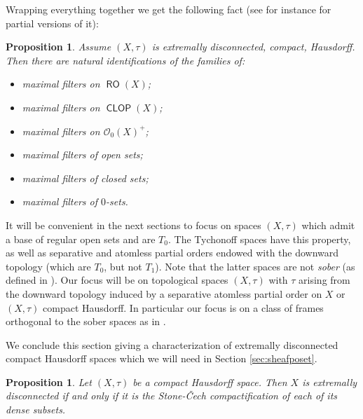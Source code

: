\documentclass[11pt]{amsart}
\theoremstyle{plain}
\newtheorem{proposition}[theorem]{Proposition}
\theoremstyle{definition}
\theoremstyle{plain}
\theoremstyle{remark}
\DeclareMathOperator{\RO}{\mathsf{RO}}
\DeclareMathOperator{\CLOP}{\mathsf{CLOP}}
\newcommand{\0}{\mathsf{0}}
\renewcommand{\1}{\mathsf{1}}
\renewcommand{\2}{\mathsf{2}}
\theoremstyle{definition}
\begin{document}
Wrapping everything together we get the following fact (see for instance \cite[Sections II.4.9 and IV.2.3]{JohnStone} for partial versions of it):
\begin{proposition}
Assume $(X,\tau)$ is extremally disconnected, compact, Hausdorff. Then there are natural identifications of the families of:
\begin{itemize}
\item maximal filters on $\RO(X)$;
\item maximal filters on $\CLOP(X)$;
\item maximal filters on $\mathcal{O}_0(X)^+$;
\item maximal filters of open sets;
\item maximal filters of closed sets;
\item maximal filters of $0$-sets.
\end{itemize}
\end{proposition}

It will be convenient in the next sections to focus on spaces $(X,\tau)$ which admit a base of regular open sets and are $T_0$.
The Tychonoff spaces have this property, as well as separative and atomless partial orders endowed with the downward topology (which are $T_0$, but not $T_1$).
Note that the latter spaces are not \emph{sober} (as defined in \cite[Section IX.3]{MacLMoer}). Our focus will be on topological spaces $(X,\tau)$ with $\tau$ arising from the downward topology induced by a separative atomless partial order on $X$ or $(X,\tau)$ compact Hausdorff. In particular our focus is on a class of frames orthogonal to the sober spaces as in \cite[Chapter IX]{MacLMoer}.



We conclude this section giving a characterization of extremally disconnected compact Hausdorff spaces which we will need in Section \ref{sec:sheafposet}.
 
\begin{proposition}
 \label{comp:exdisc}
 Let $(X,\tau)$ be a compact Hausdorff space. Then $X$ is extremally disconnected if and only if it is the Stone-\v{C}ech compactification of each of its dense subsets.
 \end{proposition}
 
\end{document}
